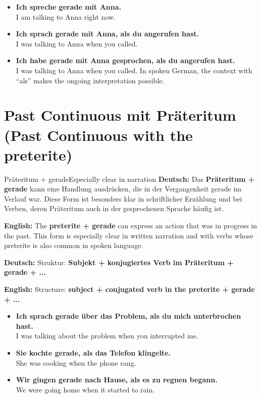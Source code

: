 \documentclass[a4paper,11pt]{article}
\newcommand{\GermanText}[1]{\textbf{Deutsch: }#1\par}
\newcommand{\EnglishText}[1]{{\small\color{SoftGray}\textbf{English: }#1\par}}
\newcommand{\ExampleItem}[2]{\item \textbf{#1}\\{\small\color{SoftGray}#2}}
\begin{document}
        \begin{exbox}
            \begin{itemize}
                \ExampleItem{Ich spreche gerade mit Anna.}{I am talking to Anna right now.}
                \ExampleItem{Ich sprach gerade mit Anna, als du angerufen hast.}{I was talking to Anna when you called.}
                \ExampleItem{Ich habe gerade mit Anna gesprochen, als du angerufen hast.}{I was talking to Anna when you called. In spoken German, the context with ``als'' makes the ongoing interpretation possible.}
            \end{itemize}
        \end{exbox}

    \section{Past Continuous mit Präteritum \textnormal{(Past Continuous with the preterite)}}

        \begin{grammarentry}{Präteritum + gerade}{Especially clear in narration}
            \GermanText{Das \textbf{Präteritum + gerade} kann eine Handlung ausdrücken, die in der Vergangenheit gerade im Verlauf war. Diese Form ist besonders klar in schriftlicher Erzählung und bei Verben, deren Präteritum auch in der gesprochenen Sprache häufig ist.}
            \EnglishText{The \textbf{preterite + gerade} can express an action that was in progress in the past. This form is especially clear in written narration and with verbs whose preterite is also common in spoken language.}

            \GermanText{Struktur: \textbf{Subjekt + konjugiertes Verb im Präteritum + gerade + ...}}
            \EnglishText{Structure: \textbf{subject + conjugated verb in the preterite + gerade + ...}}
        \end{grammarentry}

        \begin{exbox}
            \begin{itemize}
                \ExampleItem{Ich sprach gerade über das Problem, als du mich unterbrochen hast.}{I was talking about the problem when you interrupted me.}
                \ExampleItem{Sie kochte gerade, als das Telefon klingelte.}{She was cooking when the phone rang.}
                \ExampleItem{Wir gingen gerade nach Hause, als es zu regnen begann.}{We were going home when it started to rain.}
            \end{itemize}
        \end{exbox}
\end{document}
